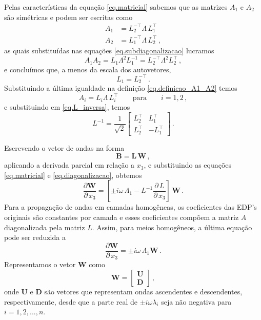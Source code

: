 Pelas caracter\'isticas da equa\c{c}\~ao \ref{eq.matricial} sabemos que as matrizes $A_1$ e $A_2$ s\~ao sim\'etricas e podem ser escritas como
\begin{align*}
A_1&=L_2^{-\top}\Lambda\,L_1^\top\\
A_2&=L_1^{-\top}\Lambda\,L_2^\top\,,
\end{align*}
as quais substitu\'idas nas equa\c{c}\~oes \ref{eq.subdiagonalizacao} lucramos
\begin{equation*}
A_1A_2=L_1\Lambda^2L_1^{-1}=L_2^{-\top}\Lambda^2L_2^\top\,,
\end{equation*}
e conclu\'imos que, a menos da escala dos autovetores,
\begin{equation*}
L_1=L_2^{-\top}\,.
\end{equation*}
Substituindo a \'ultima igualdade na defini\c{c}\~ao \ref{eq.definicao_A1_A2} temos
\begin{equation*}
A_i=L_i\Lambda\,L_i^{\top}\qquad\text{para}\qquad i=1,2\,,
\end{equation*}
e substituindo em \ref{eq.L_inversa}, temos
\begin{equation}\label{eq.L_inversa_2}
L^{-1}=\frac{1}{\sqrt{2}}
\begin{bmatrix}
L_2^{\top}&L_1^{\top}\\
L_2^{\top}&-L_1^{\top}
\end{bmatrix}\,.
\end{equation}

Escrevendo o vetor de ondas na forma
\begin{equation*}
\mathbf{B}=\mathbf{L}\,\mathbf{W}\,,
\end{equation*}
aplicando a derivada parcial em rela\c{c}\~ao a $x_3$, e substituindo as equa\c{c}\~oes \ref{eq.matricial} e \ref{eq.diagonalizacao}, obtemos
\begin{equation}\label{eq.derivada_W}
\frac{\partial\mathbf{W}}{\partial\,x_3}=\left[\pm i\omega\,\Lambda_1-L^{-1}\frac{\partial\,L}{\partial\,x_3}\right]\,\mathbf{W}\,.
\end{equation}
Para a propaga\c{c}\~ao de ondas em camadas homog\^eneas, os coeficientes das EDP's originais s\~ao constantes por camada e esses coeficientes comp\~oem a matriz $A$ diagonalizada pela matriz $L$. Assim, para meios homog\^eneos, a \'ultima equa\c{c}\~ao pode ser reduzida a
\begin{equation*}
\frac{\partial\mathbf{W}}{\partial\,x_3}=\pm i\omega\,\Lambda_1\mathbf{W}\,.
\end{equation*}
Representamos o vetor $\mathbf{W}$ como
\begin{equation*}
\mathbf{W}=
\begin{bmatrix}
\mathbf{U}\\
\mathbf{D}
\end{bmatrix}\,,
\end{equation*}
onde $\mathbf{U}$ e $\mathbf{D}$ s\~ao vetores que representam ondas ascendentes e descendentes, respectivamente, desde que a parte real de $\pm i\omega\lambda_i$ seja n\~ao negativa para $i=1,2,...,n$.

